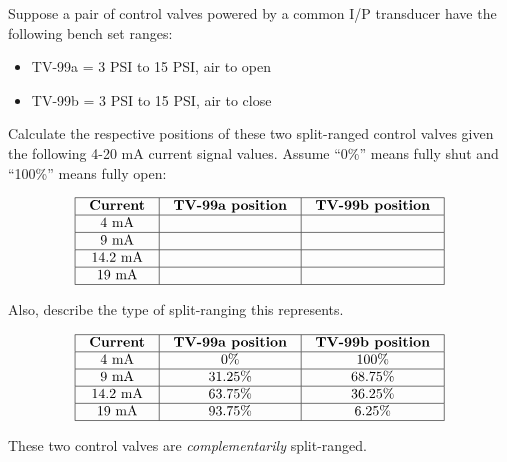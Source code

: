 

Suppose a pair of control valves powered by a common I/P transducer have the following bench set ranges:

\begin{itemize}
\item{} TV-99a = 3 PSI to 15 PSI, air to open
\item{} TV-99b = 3 PSI to 15 PSI, air to close
\end{itemize}

Calculate the respective positions of these two split-ranged control valves given the following 4-20 mA current signal values.  Assume ``0\%'' means fully shut and ``100\%'' means fully open:


$$\vbox{\offinterlineskip
\halign{\strut
\vrule \quad\hfil # \ \hfil & 
\vrule \quad\hfil # \ \hfil & 
\vrule \quad\hfil # \ \hfil \vrule \cr
\noalign{\hrule}
%
{\bf Current} & {\bf TV-99a position} & {\bf TV-99b position} \cr
%
\noalign{\hrule}
%
4 mA &  &  \cr
%
\noalign{\hrule}
%
9 mA &  &  \cr
%
\noalign{\hrule}
%
14.2 mA &  &  \cr
%
\noalign{\hrule}
%
19 mA &  &  \cr
%
\noalign{\hrule}
} %
}$$ %

Also, describe the type of split-ranging this represents.








$$\vbox{\offinterlineskip
\halign{\strut
\vrule \quad\hfil # \ \hfil & 
\vrule \quad\hfil # \ \hfil & 
\vrule \quad\hfil # \ \hfil \vrule \cr
\noalign{\hrule}
%
{\bf Current} & {\bf TV-99a position} & {\bf TV-99b position} \cr
%
\noalign{\hrule}
%
4 mA & 0\% & 100\% \cr
%
\noalign{\hrule}
%
9 mA & 31.25\% & 68.75\% \cr
%
\noalign{\hrule}
%
14.2 mA & 63.75\% & 36.25\% \cr
%
\noalign{\hrule}
%
19 mA & 93.75\% & 6.25\% \cr
%
\noalign{\hrule}
} %
}$$ %

These two control valves are {\it complementarily} split-ranged.











